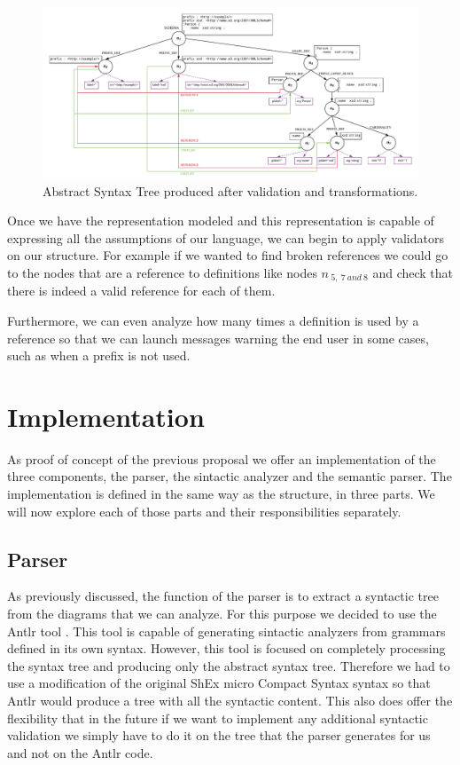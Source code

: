 \begin{figure}
    \includegraphics[width=\textwidth]{images/shex-lite-sema-anal.pdf}
    \centering
    \caption[Abstract Syntax Tree produced after validation and transformations]{Abstract Syntax Tree produced after validation and
    transformations.}
    \label{fig:shex-lite-sema-anal}
\end{figure}

Once we have the representation modeled and this representation is capable of expressing all the assumptions of our language,
we can begin to apply validators on our structure. For example if we wanted to find broken references we could go to the nodes
that are a reference to definitions like nodes $n_{\:5,\:7\:and\:8}$ and check that there is indeed a valid reference for each of them.

Furthermore, we can even analyze how many times a definition is used by a reference so that we can launch messages warning the end user
in some cases, such as when a prefix is not used.

\section{Implementation}\label{sec:anal-implementation}
As proof of concept of the previous proposal we offer an implementation of the three components, the parser, the sintactic analyzer
and the semantic parser. The implementation is defined in the same way as the structure, in three parts. We will now explore each
of those parts and their responsibilities separately.

\subsection{Parser}
As previously discussed, the function of the parser is to extract a syntactic tree from the diagrams that we can analyze.
For this purpose we decided to use the Antlr tool \cite{parr1995antlr}. This tool is capable of generating sintactic analyzers
from grammars defined in its own syntax. However, this tool is focused on completely processing the syntax tree and producing
only the abstract syntax tree. Therefore we had to use a modification of the original ShEx micro Compact Syntax syntax so that
Antlr would produce a tree with all the syntactic content. This also does offer the flexibility that in the future if we want to
implement any additional syntactic validation we simply have to do it on the tree that the parser generates for
us and not on the Antlr code.

